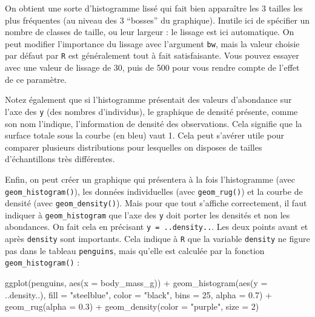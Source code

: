\documentclass[
  letterpaper,
  DIV=11,
  numbers=noendperiod]{scrreprt}
\newenvironment{Shaded}{\begin{snugshade}}{\end{snugshade}}
\newcommand{\AttributeTok}[1]{\textcolor[rgb]{0.40,0.45,0.13}{#1}}
\newcommand{\DecValTok}[1]{\textcolor[rgb]{0.68,0.00,0.00}{#1}}
\newcommand{\FloatTok}[1]{\textcolor[rgb]{0.68,0.00,0.00}{#1}}
\newcommand{\FunctionTok}[1]{\textcolor[rgb]{0.28,0.35,0.67}{#1}}
\newcommand{\NormalTok}[1]{\textcolor[rgb]{0.00,0.23,0.31}{#1}}
\newcommand{\SpecialCharTok}[1]{\textcolor[rgb]{0.37,0.37,0.37}{#1}}
\newcommand{\StringTok}[1]{\textcolor[rgb]{0.13,0.47,0.30}{#1}}
\begin{document}
On obtient une sorte d'histogramme lissé qui fait bien apparaître les 3
tailles les plus fréquentes (au niveau des 3 ``bosses'' du graphique).
Inutile ici de spécifier un nombre de classes de taille, ou leur largeur
: le lissage est ici automatique. On peut modifier l'importance du
lissage avec l'argument \texttt{bw}, mais la valeur choisie par défaut
par \texttt{R} est généralement tout à fait satisfaisante. Vous pouvez
essayer avec une valeur de lissage de 30, puis de 500 pour vous rendre
compte de l'effet de ce paramètre.

Notez également que si l'histogramme présentait des valeurs d'abondance
sur l'axe des \texttt{y} (des nombres d'individus), le graphique de
densité présente, comme son nom l'indique, l'information de densité des
observations. Cela signifie que la surface totale sous la courbe (en
bleu) vaut 1. Cela peut s'avérer utile pour comparer plusieurs
distributions pour lesquelles on disposes de tailles d'échantillons très
différentes.

Enfin, on peut créer un graphique qui présentera à la fois l'histogramme
(avec \texttt{geom\_histogram()}), les données individuelles (avec
\texttt{geom\_rug()}) et la courbe de densité (avec
\texttt{geom\_density()}). Mais pour que tout s'affiche correctement, il
faut indiquer à \texttt{geom\_histogram} que l'axe des \texttt{y} doit
porter les densités et non les abondances. On fait cela en précisant
\texttt{y\ =\ ..density..}. Les deux points avant et après
\texttt{density} sont importants. Cela indique à \texttt{R} que la
variable \texttt{density} ne figure pas dans le tableau
\texttt{penguins}, mais qu'elle est calculée par la fonction
\texttt{geom\_histogram()} :

\begin{Shaded}
\begin{Highlighting}[]
\FunctionTok{ggplot}\NormalTok{(penguins, }\FunctionTok{aes}\NormalTok{(}\AttributeTok{x =}\NormalTok{ body\_mass\_g)) }\SpecialCharTok{+}
  \FunctionTok{geom\_histogram}\NormalTok{(}\FunctionTok{aes}\NormalTok{(}\AttributeTok{y =}\NormalTok{ ..density..),}
                 \AttributeTok{fill =} \StringTok{"steelblue"}\NormalTok{, }\AttributeTok{color =} \StringTok{"black"}\NormalTok{,}
                 \AttributeTok{bins =} \DecValTok{25}\NormalTok{, }\AttributeTok{alpha =} \FloatTok{0.7}\NormalTok{) }\SpecialCharTok{+}
  \FunctionTok{geom\_rug}\NormalTok{(}\AttributeTok{alpha =} \FloatTok{0.3}\NormalTok{) }\SpecialCharTok{+}
  \FunctionTok{geom\_density}\NormalTok{(}\AttributeTok{color =} \StringTok{"purple"}\NormalTok{, }\AttributeTok{size =} \DecValTok{2}\NormalTok{)}
\end{Highlighting}
\end{Shaded}
\end{document}
